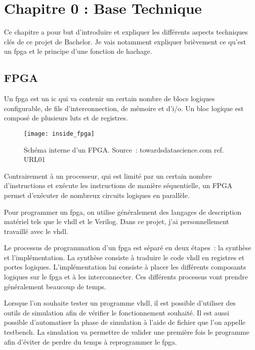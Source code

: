 \chapter{Chapitre 0 : Base Technique}

Ce chapitre a pour but d'introduire et expliquer les différents aspects techniques clés de ce projet de Bachelor. Je vais notamment expliquer brièvement ce qu'est un \gls{fpga} et le principe d'une fonction de hachage.

\section{FPGA}

Un \gls{fpga} est un \gls{ic} qui va contenir un certain nombre de blocs logiques configurable, de fils d'interconnection, de mémoire et d'\gls{i/o}.
Un bloc logique est composé de plusieurs \gls{lut}s et de registres.

\begin{figure}[tbph!]
	\centering
	\texttt{[image: inside\_fpga]}
	\caption[Schéma interne d'un FPGA]{Schéma interne d'un FPGA. Source : towardsdatascience.com ref. URL01}
	\label{fig:inside_fpga}
\end{figure}

Contrairement à un processeur, qui est limité par un certain nombre d'instructions et exécute les instructions de manière séquentielle, un FPGA permet d'exécuter de nombreux circuits logiques en parallèle.

Pour programmer un \gls{fpga}, on utilise généralement des langages de description matériel tels que le \gls{vhdl} et le Verilog. Dans ce projet, j'ai personnellement travaillé avec le \gls{vhdl}.

Le processus de programmation d'un \gls{fpga} est séparé en deux étapes : la synthèse et l'implémentation. 
La synthèse consiste à traduire le code \gls{vhdl} en registres et portes logiques. 
L'implémentation lui consiste à placer les différents composants logiques sur le \gls{fpga} et à les interconnecter.
Ces différents processus vont prendre généralement beaucoup de temps.

Lorsque l'on souhaite tester un programme \gls{vhdl}, il est possible d'utiliser des outils de simulation afin de vérifier le fonctionnement souhaité. Il est aussi possible d'automatiser la phase de simulation à l'aide de fichier que l'on appelle testbench.
La simulation va permettre de valider une première fois le programme afin d'éviter de perdre du temps à reprogrammer le \gls{fpga}.

